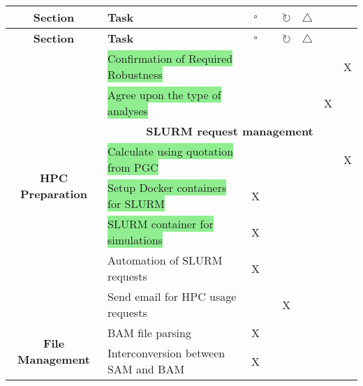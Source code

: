 \documentclass[11pt]{report}
\newcommand{\done}{\checkmark}
\newcommand{\pending}{$\square$}
\newcommand{\refine}{$\circlearrowright$}
\newcommand{\issue}{$\triangle$}
\newcommand{\draft}{\faPencil}
\newcommand{\moved}{\faArrowCircleRight}
\newcommand{\highlightessential}[1]{\colorbox{lightgreen}{#1}}
\newcommand{\highlightoptional}[1]{\colorbox{lightorange}{#1}}
\begin{document}
\begin{longtable}{|c|p{8cm}|c|c|c|c|c|c|}
	\hline
	\textbf{Section} & \textbf{Task} & \pending & \draft & \refine & \issue & \moved & \done \\ \hline
	\endfirsthead
	\hline
	\textbf{Section} & \textbf{Task} & \pending & \draft & \refine & \issue & \moved & \done \\ \hline
	\endhead
	
	\multirow{8}{*}{\textbf{HPC Preparation}} 
	& \highlightessential{Confirmation of Required Robustness} & & & & & & X \\ 
	& \highlightessential{Agree upon the type of analyses} & & & & & X & \\ 
	& \multicolumn{7}{c|}{\textbf{SLURM request management}} \\
	& \highlightessential{Calculate using quotation from PGC} & & & & & & X \\ 
	& \highlightessential{Setup Docker containers for SLURM} & X & & & & & \\
	& \highlightessential{SLURM container for simulations} & X & & & & & \\ 
	& \highlightoptional{Automation of SLURM requests} & X & & & & & \\
	& \highlightoptional{Send email for HPC usage requests} & & & X & & & \\ \hline
	
	\multirow{2}{*}{\textbf{File Management}} 
	& \highlightoptional{BAM file parsing} & X & & & & & \\
	& \highlightoptional{Interconversion between SAM and BAM} & X & & & & & \\ \hline
	

\end{longtable}
\end{document}
